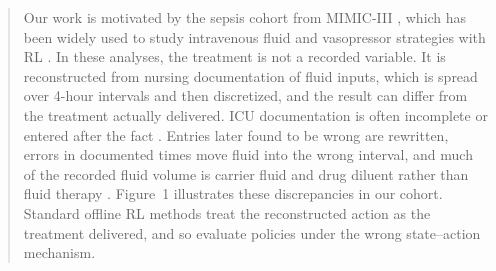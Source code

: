 \documentclass[12pt]{article}
\newcommand{\res}[1]{{\color{red}{#1}}}
\newcommand{\0}{\boldsymbol{0}}
\theoremstyle{definition}
\newenvironment{reproducedtext}{\begin{quote}\small}{\end{quote}}
\begin{document}
\begin{reproducedtext}
Our work is motivated by the sepsis cohort from MIMIC-III \citep{johnson2016mimic}, which has been widely used to study intravenous fluid and vasopressor strategies with RL \citep{komorowski2018artificial,gottesman2019guidelines}. In these analyses, the treatment is not a recorded variable. It is reconstructed from nursing documentation of fluid inputs, which is spread over 4-hour intervals and then discretized, and the result can differ from the treatment actually delivered. ICU documentation is often incomplete or entered after the fact \citep{perren2011fluid,raimann2024mind}. Entries later found to be wrong are rewritten, errors in documented times move fluid into the wrong interval, and much of the recorded fluid volume is carrier fluid and drug diluent rather than fluid therapy \citep{vanregenmortel2018maintenance}. Figure~1 illustrates these discrepancies in our cohort. \res{[One sentence on the implied misrecording rate.]} Standard offline RL methods treat the reconstructed action as the treatment delivered, and so evaluate policies under the wrong state--action mechanism.
\end{reproducedtext}
\end{document}

